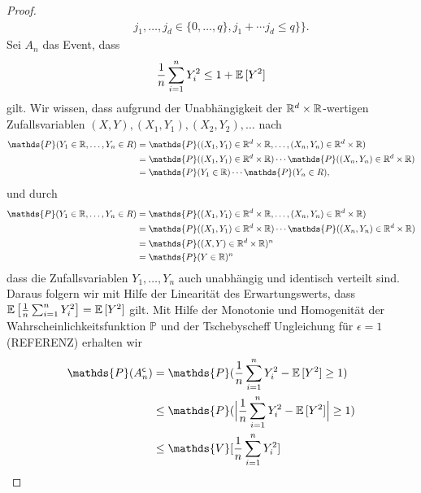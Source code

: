 \begin{proof}
\begin{equation}
\begin{split}
& \quad j_1,\dots,j_d \in \{0,\dots,q\}, j_1 + \cdots j_d \leq q\biggr\}\Biggr\}.
\end{split}
\end{equation}
Sei $A_n$ das Event, dass 
\begin{equation}
\label{event}
\frac{1}{n} \sum_{i = 1}^n Y_i^2 \leq 1 + \mathbb{E}\,[Y^2]
\end{equation}
gilt.
Wir wissen, dass aufgrund der Unabhängigkeit der $\mathbb{R}^d \times \mathbb{R}$-wertigen Zufallsvariablen  $(X, Y), (X_1, Y_1), (X_2, Y_2), \dots$ nach 
\begin{equation*}
\begin{split}
\mathds{P}(Y_1 \in \R, \dots, Y_n \in R) & = \mathds{P}((X_1, Y_1) \in \R^d \times \R, \dots, (X_n, Y_n) \in \R^d \times \R) \\
& = \mathds{P}((X_1, Y_1) \in \R^d \times \R) \cdots \mathds{P}((X_n, Y_n) \in \R^d \times \R) \\
& = \mathds{P}(Y_1 \in \R) \cdots \mathds{P}(Y_n \in R) ,
\end{split}
\end{equation*}
und durch
\begin{equation*}
\begin{split}
\mathds{P}(Y_1 \in \R, \dots, Y_n \in R) & = \mathds{P}((X_1, Y_1) \in \R^d \times \R, \dots, (X_n, Y_n) \in \R^d \times \R) \\
& = \mathds{P}((X_1, Y_1) \in \R^d \times \R) \cdots \mathds{P}((X_n, Y_n) \in \R^d \times \R) \\
& = \mathds{P}((X, Y) \in \R^d \times \R)^n \\
& = \mathds{P}(Y \in \R)^n
\end{split}
\end{equation*}
dass die Zufallsvariablen $Y_1,\dots,Y_n$ auch unabhängig und identisch verteilt sind. Daraus folgern wir mit Hilfe der Linearität des Erwartungswerts, dass $\mathbb{E}\,\big[\frac{1}{n} \sum_{i = 1}^n Y_i^2\big] = \mathbb{E}\,[Y^2]$ gilt.
Mit Hilfe der Monotonie und Homogenität der Wahrscheinlichkeitsfunktion $\mathds{P}$ und der Tschebyscheff Ungleichung für $\epsilon = 1$ (REFERENZ) erhalten wir
\begin{equation}
\label{tscheby}
\begin{split}
\mathds{P}(A_n^{\mathsf{c}}) & = \mathds{P}(\frac{1}{n}\sum_{i=1}^n Y_i^2 - \E[Y^2] \geq 1) \\
& \leq \mathds{P}(\Big|\frac{1}{n}\sum_{i=1}^n Y_i^2 - \E[Y^2]\Big| \geq 1) \\
& \leq \mathds{V}[\frac{1}{n}\sum_{i = 1}^nY_i^2] \\

\end{split}
\end{equation}
\end{proof}

